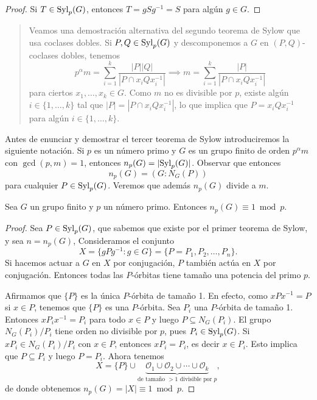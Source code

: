 \begin{proof}
Si $T\in\mathrm{Syl}_p(G)$, entonces $T=gSg^{-1}=S$ para algún $g\in G$. 	
\end{proof}

\begin{quote}
Veamos una 
demostración alternativa del segundo teorema de Sylow que usa coclases dobles. 
Si $P,Q\in\mathrm{Syl}_p(G)$ y 
descomponemos a $G$ en $(P,Q)$-coclases dobles, tenemos
\[
p^\alpha m=\sum_{i=1}^k\frac{|P||Q|}{|P\cap x_iQx_i^{-1}|}
\implies
m=\sum_{i=1}^k\frac{|P|}{|P\cap x_iQx_i^{-1}|}
\]
para ciertos $x_1,\dots,x_k\in G$. 
Como $m$ no es divisible por $p$, existe algún $i\in\{1,\dots,k\}$ tal que $|P|=|P\cap x_iQx_i^{-1}|$, lo que
implica que $P=x_iQx_i^{-1}$ para algún $i\in\{1,\dots,k\}$. 
\end{quote}

Antes de enunciar y demostrar el tercer teorema de Sylow introduciremos la siguiente notación. Si $p$ es un número primo y $G$ es un grupo finito de orden $p^\alpha m$ con $\gcd(p,m)=1$, entonces
$n_p(G)=|\mathrm{Syl}_p(G)|$. Observar que entonces 
\[
n_p(G)=(G:N_G(P))
\]
para cualquier $P\in\mathrm{Syl}_p(G)$. Veremos que además $n_p(G)$ divide a $m$. 

\begin{theorem}
Sea $G$ un grupo finito y $p$ un número primo. Entonces $n_p(G)\equiv 1\bmod p$. 	
\end{theorem}

\begin{proof}
	Sea $P\in\mathrm{Syl}_p(G)$, que sabemos que existe por el primer teorema de Sylow, y sea $n=n_p(G)$, Consideramos
	el conjunto
	\[
	X=\{gPg^{-1}:g\in G\}=\{P=P_1,P_2,\dots,P_n\}.
	\] 
	Si hacemos actuar a $G$ en $X$ por conjugación, $P$ también actúa en $X$ por conjugación. 
	Entonces todas las $P$-órbitas tiene tamaño una potencia del primo $p$. 
	
	Afirmamos que $\{P\}$ es la única $P$-órbita de tamaño 1. En efecto, como $xPx^{-1}=P$ si $x\in P$, tenemos que $\{P\}$ es una $P$-órbita. Sea $P_i$ una $P$-órbita de tamaño 1. Entonces
	$xP_ix^{-1}=P_i$ para todo $x\in P$ y luego $P\subseteq N_G(P_i)$. El grupo
	$N_G(P_i)/P_i$ tiene orden no divisible por $p$, pues $P_i\in\mathrm{Syl}_p(G)$. Si $xP_i\in N_G(P_i)/P_i$ con $x\in P$, entonces $xP_i=P_i$, es decir $x\in P_i$. Esto implica
	que $P\subseteq P_i$ y luego $P=P_i$. Ahora tenemos 
	\[
	X=\{P\}\cup \underbrace{\mathcal{O}_1\cup\mathcal{O}_2\cup\cdots\cup\mathcal{O}_k}_{\text{de tamaño $>1$ divisible por $p$}},
	\]
	de donde obtenemos $n_p(G)=|X|\equiv 1\bmod p$. 
\end{proof}

